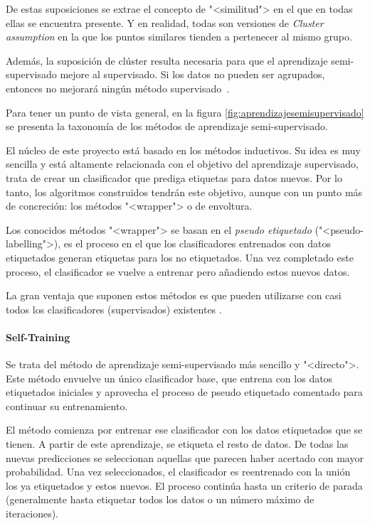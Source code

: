 De estas suposiciones se extrae el concepto de "<similitud"> en el que en todas
ellas se encuentra presente. Y en realidad, todas son versiones de
\textit{Cluster assumption} en la que los puntos similares tienden a pertenecer
al mismo grupo. 

Además, la suposición de clúster resulta necesaria para que el aprendizaje
semi-supervisado mejore al supervisado. Si los datos no pueden ser agrupados,
entonces no mejorará ningún método supervisado~\cite{vanEngelen2020}.


Para tener un punto de vista general, en la figura \ref{fig:aprendizajesemisupervisado} se presenta la
taxonomía de los métodos de aprendizaje semi-supervisado.


El núcleo de este proyecto está basado en los métodos inductivos. Su idea es muy
sencilla y está altamente relacionada con el objetivo del aprendizaje
supervisado, trata de crear un clasificador que prediga etiquetas para datos
nuevos. Por lo tanto, los algoritmos construidos tendrán este objetivo, aunque
con un punto más de concreción: los métodos "<wrapper"> o de envoltura.

Los conocidos métodos "<wrapper"> se basan en el \textit{pseudo etiquetado}
("<pseudo-labelling">), es el proceso en el que los clasificadores entrenados
con datos etiquetados generan etiquetas para los no etiquetados. Una vez
completado este proceso, el clasificador se vuelve a entrenar pero añadiendo
estos nuevos datos.

La gran ventaja que suponen estos métodos es que pueden utilizarse con casi
todos los clasificadores (supervisados) existentes \cite{vanEngelen2020}.

\paragraph{Self-Training}
Se trata del método de aprendizaje semi-supervisado más sencillo y "<directo">.
Este método envuelve un único clasificador base, que entrena con los datos
etiquetados iniciales y aprovecha el proceso de pseudo etiquetado comentado para
continuar su entrenamiento.

El método comienza por entrenar ese clasificador con los datos etiquetados que
se tienen. A partir de este aprendizaje, se etiqueta el resto de datos. De todas
las nuevas predicciones se seleccionan aquellas que parecen haber acertado con
mayor probabilidad. Una vez seleccionados, el clasificador es reentrenado con la
unión los ya etiquetados y estos nuevos. El proceso continúa hasta un criterio
de parada (generalmente hasta etiquetar todos los datos o un número máximo de
iteraciones).

